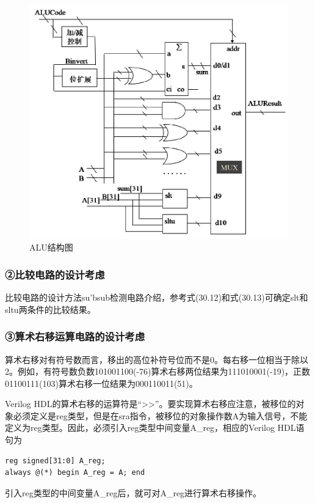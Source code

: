 \documentclass[12pt,hyperref,a4paper,UTF8]{ctexart}
\begin{document}
    \begin{figure}[H]
        \centering
        \includegraphics[width=1\textwidth]{figures/fig/image10.png}
        \caption{ALU结构图}
    \end{figure}

\subsubsection*{②比较电路的设计考虑}
比较电路的设计方法su'bsub检测电路介绍，参考式(30.12)和式(30.13)可确定slt和sltu两条件的比较结果。

\subsubsection*{③算术右移运算电路的设计考虑}
算术右移对有符号数而言，移出的高位补符号位而不是0。每右移一位相当于除以2。例如，有符号数负数101001100(-76)算术右移两位结果为111010001(-19)，正数01100111(103)算术右移一位结果为000110011(51)。

Verilog HDL的算术右移的运算符是“\textgreater\textgreater”。要实现算术右移应注意，被移位的对象必须定义是reg类型，但是在sra指令，被移位的对象操作数A为输入信号，不能定义为reg类型。因此，必须引入reg类型中间变量A\_reg，相应的Verilog HDL语句为
\begin{verbatim}
reg signed[31:0] A_reg;
always @(*) begin A_reg = A; end
\end{verbatim}

引入reg类型的中间变量A\_reg后，就可对A\_reg进行算术右移操作。
\end{document}
